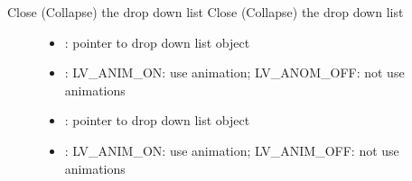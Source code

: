 \documentclass[letterpaper,10pt,english]{sphinxmanual}
\begin{document}
\begin{fulllineitems}
\label{\detokenize{object-types/ddlist:_CPPv415lv_ddlist_closeP8lv_obj_t16lv_anim_enable_t}}%
\pysigstartmultiline
{}\label{\detokenize{object-types/ddlist:lv__ddlist_8h_1a7a28a75dd619c368d46988d39815c968}}%
\pysigstopmultiline
Close (Collapse) the drop down list 
Close (Collapse) the drop down list 
\begin{description}
\item[{}] \leavevmode\begin{itemize}
\item {} 
: pointer to drop down list object 

\item {} 
: LV\_ANIM\_ON: use animation; LV\_ANOM\_OFF: not use animations

\end{itemize}

\item[{}] \leavevmode\begin{itemize}
\item {} 
: pointer to drop down list object 

\item {} 
: LV\_ANIM\_ON: use animation; LV\_ANIM\_OFF: not use animations 

\end{itemize}

\end{description}


\end{fulllineitems}

\end{document}
